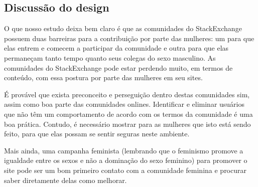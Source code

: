 \subsection{Discussão do design}

O que nosso estudo deixa bem claro é que as comunidades do StackExchange possuem duas barreiras para a contribuição por parte das mulheres: um para que elas entrem e comecem a participar da comunidade e outra para que elas permaneçam tanto tempo quanto seus colegas do sexo masculino. As comunidades do StackExchange pode estar perdendo muito, em termos de conteúdo, com essa postura por parte das mulheres em seu sites.

É provável que exista preconceito e perseguição dentro destas comunidades sim, assim como boa parte das comunidades onlines. Identificar e eliminar usuários que não têm um comportamento de acordo com os termos da comunidade é uma boa prática. Contudo, é necessário mostrar para as mulheres que isto está sendo feito, para que elas possam se sentir seguras neste ambiente. 

Mais ainda, uma campanha feminista (lembrando que o feminismo promove a igualdade entre os sexos e não a dominação do sexo feminino) para promover o site pode ser um bom primeiro contato com a comunidade feminina e procurar saber diretamente delas como melhorar.




